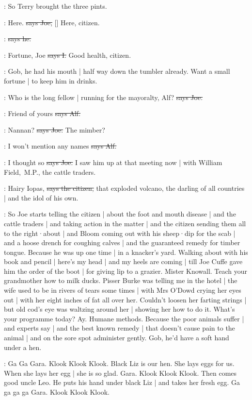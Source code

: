 \Nq:
So Terry brought the three pints.

\joe:
Here.
\sout{says Joe,}
[]
Here,
citizen.

\citizen:
\sout{says he.}

:
Fortune,
Joe
\sout{says I.}
Good health,
citizen.

\Nq:
Gob,
he had his mouth |
half way down the tumbler already.
Want a small fortune |
to keep him in drinks.

\joe:
Who is the long fellow |
running for the mayoralty,
Alf?
\sout{says Joe.}

\bergan:
Friend of yours
\sout{says Alf.}

\joe:
Nannan?
\sout{says Joe.}
The mimber?

\bergan:
I won't mention any names
\sout{says Alf.}

\joe:
I thought so
\sout{says Joe.}
I saw him up at that meeting now |
with William Field,~M.P.,
the cattle traders.

\citizen:
Hairy Iopas,
\sout{says the citizen,}
that exploded volcano,
the darling of all countries
 |
and the idol of his own.

\Nq:
So Joe starts telling the citizen |
about the foot and mouth disease |
and the cattle traders |
and taking action in the matter |
and the citizen sending them all to the right·about |
and Bloom coming out with his sheep·dip for the scab |
and a hoose drench for coughing calves |
and the guaranteed remedy for timber tongue.
Because he was up one time |
in a knacker's yard.
Walking about with his book and pencil |
here's my head |
and my heels are coming |
till Joe Cuffe gave him the order of the boot |
for giving lip to a grazier.
Mister Knowall.
Teach your grandmother how to milk ducks.
Pisser Burke was telling me in the hotel  |
the wife used to be in rivers of tears some times |
with Mrs O'Dowd crying her eyes out
 |
with her eight inches of fat all over her.
Couldn't loosen her farting strings |
but old cod's eye was waltzing around her |
showing her how to do it.
What's your programme today?
Ay.
Humane methods.
Because the poor animals suffer |
and experts say |
and the best known remedy |
that doesn't cause pain to the animal |
and on the sore spot administer gently.
Gob,
he'd have a soft hand under a hen.

:
Ga Ga Gara.
Klook Klook Klook.
Black Liz is our hen.
She lays eggs for us.
When she lays her egg |
she is so glad.
Gara.
Klook Klook Klook.
Then comes good uncle Leo.
He puts his hand under black Liz |
and takes her fresh egg.
Ga ga ga ga Gara.
Klook Klook Klook.

